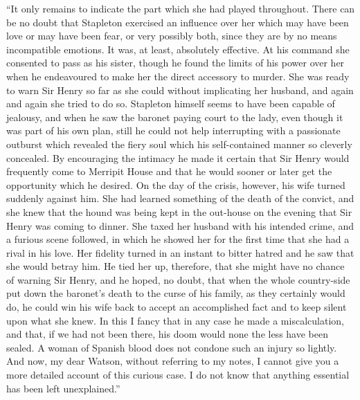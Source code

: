 \documentclass[paper=a5,BCOR=7mm,twoside,DIV=calc,12pt,usegeometry,openany,chapterprefix,endperiod,headings=big]{scrbook} %
\begin{document}



\enquote{It only remains to indicate the part which she had played \newline throughout. There can be no doubt that Stapleton exercised an influence over her which may have been love or may have been fear, or very possibly both, since they are by no means incompatible emotions. It was, at least, absolutely effective. At his command she consented to pass as his sister, though he found the limits of his power over her when he endeavoured to make her the direct accessory to murder. She was ready to warn Sir Henry so far as she could without implicating her husband, and again and again she tried to do so. Stapleton himself seems to have been capable of jealousy, and when he saw the baronet paying court to the lady, even though it was part of his own plan, still he could not help interrupting with a passionate outburst which revealed the fiery soul which his self-contained manner so cleverly concealed. By encouraging the intimacy he made it certain that Sir Henry would frequently come to Merripit House and that he would sooner or later get the opportunity which he desired. On the day of the crisis, however, his wife turned suddenly against him. She had learned something of the death of the convict, and she knew that the hound was being kept in the out-house on the evening that Sir Henry was coming to dinner. She taxed her husband with his intended crime, and a furious scene followed, in which he showed her for the first time that she had a rival in his love. Her fidelity turned in an instant to bitter hatred and he saw that she would betray him. He tied her up, therefore, that she might have no chance of warning Sir Henry, and he hoped, no doubt, that when the whole country-side put down the baronet's death to the curse of his family, as they certainly would do, he could win his wife back to accept an accomplished fact and to keep silent upon what she knew. In this I fancy that in any case he made a miscalculation, and that, if we had not been there, his doom would none the less have been sealed. A woman of Spanish blood does not condone such an injury so lightly. And now, my dear Watson, without referring to my notes, I cannot give you a more detailed account of this curious case. I do not know that anything essential has been left unexplained.}
\end{document}
